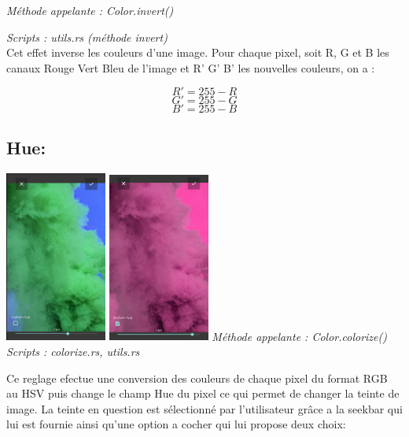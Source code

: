 \emph{Méthode appelante : Color.invert()}

\emph{Scripts : utils.rs (méthode invert)} 
\\

Cet effet inverse les couleurs d'une image. Pour chaque pixel, soit R, G et B les canaux Rouge Vert Bleu de l'image et R' G' B' les nouvelles couleurs, on a :

\[            
    R' =  255 - R
\] 
\[            
    G' =  255 - G
\]  
\[            
    B' =  255 - B
\] 


\subsection{Hue:}

    \includegraphics[width=0.25\textwidth]{report_src/effects/non-uniform-hue.png}
    \includegraphics[width=0.25\textwidth]{report_src/effects/uniform-hue.png}
    \newline
    \emph{Méthode appelante : Color.colorize()}
    \emph{Scripts : colorize.rs, utils.rs} 
    \newline

    Ce reglage efectue une conversion des couleurs de chaque pixel du format RGB au HSV puis change le champ Hue du pixel ce qui permet de 
    changer la teinte de image.
    La teinte en question est sélectionné par l'utilisateur grâce a la seekbar qui lui est fournie ainsi qu'une option a cocher qui lui propose deux choix:
    \\


